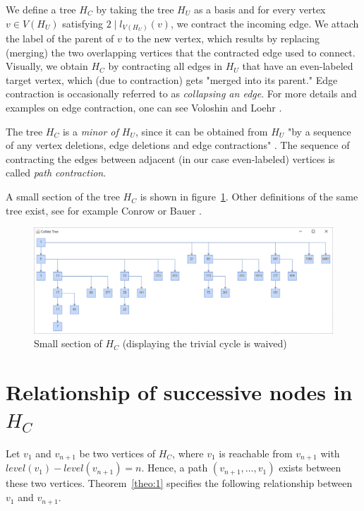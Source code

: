 \par\medskip
We define a tree $H_C$ by taking the tree $H_U$ as a basis and for every
vertex $v\in V(H_U)$ satisfying $2\mid l_{V(H_U)}(v)$, we contract the
incoming edge. We attach the label of the parent of $v$ to the new
vertex, which results by replacing (merging) the two overlapping
vertices that the contracted edge used to connect. Visually, we
obtain $H_C$ by contracting all edges in $H_U$ that have an even-labeled 
target vertex, which (due to contraction) gets "merged into its parent." 
Edge contraction is occasionally referred to as \textit{collapsing an 
edge}. For more details and examples on edge contraction, one can see
Voloshin \cite[p.~27]{Ref_Voloshin} and Loehr \cite{Ref_Loehr}.

\par\medskip
The tree $H_C$ is a \textit{minor of $H_U$}, since it can be obtained
from $H_U$ "by a sequence of any vertex deletions, edge deletions and
edge contractions" \cite[p.~32]{Ref_Voloshin}. The sequence of contracting
the edges between adjacent (in our case even-labeled) vertices is called
\textit{path contraction}.

\par\medskip
A small section of the tree $H_C$ is shown in figure~\ref{fig:2}. Other
definitions of the same tree exist, see for example Conrow 
\cite{Ref_Conrow} or Bauer \cite[p.~379]{Ref_Bauer}.

\begin{figure}
	\includegraphics[width=1.00\textwidth]{figures/h_c.png}
	\caption{Small section of $H_C$ (displaying the trivial cycle is waived)}
	\label{fig:2}
\end{figure}

\section{Relationship of successive nodes in \mbox{$H_C$}}

Let $v_1$ and $v_{n+1}$ be two vertices of $H_C$, where $v_1$ is
reachable from $v_{n+1}$ with $level(v_1)-level(v_{n+1})=n$.
Hence, a path $(v_{n+1},\ldots,v_1)$ exists between these two
vertices. Theorem~\ref{theo:1} specifies the following relationship
between $v_1$ and $v_{n+1}$.

